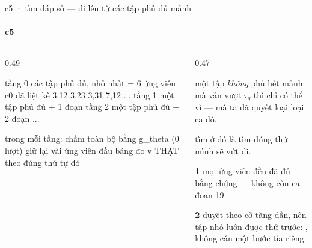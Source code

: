 \begin{frame}[fragile]{c5 · tìm đáp số — đi lên từ các tập phủ đủ mảnh}
  \framesubtitle{c5}

  \begin{columns}[t]
  \begin{column}{0.49\textwidth}
    \begin{bx}[title={các tầng}]
      \begin{dia}
tầng 0   các tập phủ đủ, nhỏ nhất
         = 6 ứng viên c0 đã liệt kê
         {3,12} {3,23} {3,31} {7,12} ...
tầng 1   một tập phủ đủ  +  1 đoạn
tầng 2   một tập phủ đủ  +  2 đoạn
...

trong mỗi tầng:
   chấm toàn bộ bằng g_theta   (0 lượt)
   giữ lại vài ứng viên đầu bảng
   đo v THẬT theo đúng thứ tự đó
      \end{dia}
    \end{bx}
  \end{column}
  \begin{column}{0.47\textwidth}
    \begin{keyb}[title={vì sao bỏ qua phần còn lại là an toàn}]
      một tập \emph{không} phủ hết mảnh mà vẫn vượt $\tau_q$ thì chỉ có thể vì
       — mà ta đã quyết loại loại ca đó.
      \vspace{0.3em}

      tìm ở đó là tìm đúng thứ mình sẽ vứt đi.
    \end{keyb}
    \begin{bx}[title={hai thứ tự nhiên đi kèm}]
      \textbf{1}\; mọi ứng viên đều đã đủ bằng chứng — không còn ca đoạn 19.
      \vspace{0.25em}

      \textbf{2}\; duyệt theo cỡ tăng dần, nên tập nhỏ luôn được thử trước:
      , không cần một bước tỉa riêng.
    \end{bx}
  \end{column}
  \end{columns}
\end{frame}
